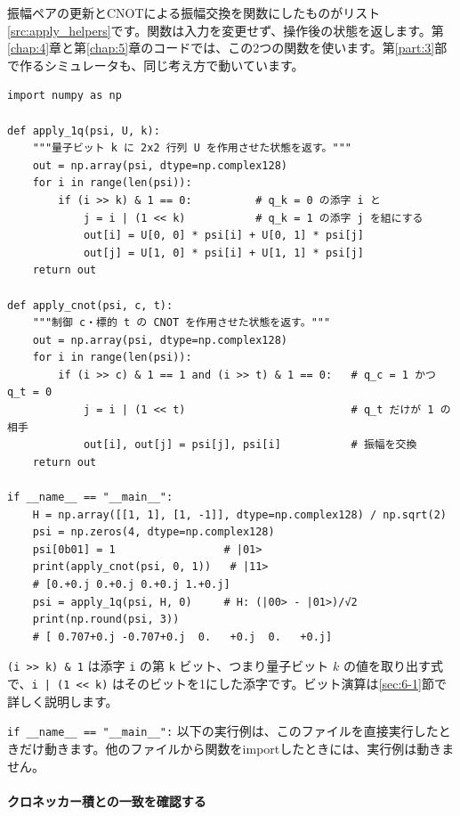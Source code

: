 振幅ペアの更新とCNOTによる振幅交換を関数にしたものがリスト\ref{src:apply_helpers}です。関数は入力を変更せず、操作後の状態を返します。第\ref{chap:4}章と第\ref{chap:5}章のコードでは、この2つの関数を使います。第\ref{part:3}部で作るシミュレータも、同じ考え方で動いています。

\begin{lstlisting}[caption={1量子ビットゲートと CNOT の適用（apply\_helpers.py）},label=src:apply_helpers]
import numpy as np

def apply_1q(psi, U, k):
    """量子ビット k に 2x2 行列 U を作用させた状態を返す。"""
    out = np.array(psi, dtype=np.complex128)
    for i in range(len(psi)):
        if (i >> k) & 1 == 0:          # q_k = 0 の添字 i と
            j = i | (1 << k)           # q_k = 1 の添字 j を組にする
            out[i] = U[0, 0] * psi[i] + U[0, 1] * psi[j]
            out[j] = U[1, 0] * psi[i] + U[1, 1] * psi[j]
    return out

def apply_cnot(psi, c, t):
    """制御 c・標的 t の CNOT を作用させた状態を返す。"""
    out = np.array(psi, dtype=np.complex128)
    for i in range(len(psi)):
        if (i >> c) & 1 == 1 and (i >> t) & 1 == 0:   # q_c = 1 かつ q_t = 0
            j = i | (1 << t)                          # q_t だけが 1 の相手
            out[i], out[j] = psi[j], psi[i]           # 振幅を交換
    return out

if __name__ == "__main__":
    H = np.array([[1, 1], [1, -1]], dtype=np.complex128) / np.sqrt(2)
    psi = np.zeros(4, dtype=np.complex128)
    psi[0b01] = 1                 # |01>
    print(apply_cnot(psi, 0, 1))   # |11>
    # [0.+0.j 0.+0.j 0.+0.j 1.+0.j]
    psi = apply_1q(psi, H, 0)     # H: (|00> - |01>)/√2
    print(np.round(psi, 3))
    # [ 0.707+0.j -0.707+0.j  0.   +0.j  0.   +0.j]
\end{lstlisting}

\texttt{(i >> k) \& 1} は添字 \texttt{i} の第 \texttt{k} ビット、つまり量子ビット $k$ の値を取り出す式で、\texttt{i | (1 << k)} はそのビットを1にした添字です。ビット演算は\ref{sec:6-1}節で詳しく説明します。

\texttt{if \_\_name\_\_ == "\_\_main\_\_":} 以下の実行例は、このファイルを直接実行したときだけ動きます。他のファイルから関数をimportしたときには、実行例は動きません。

\paragraph{クロネッカー積との一致を確認する}

